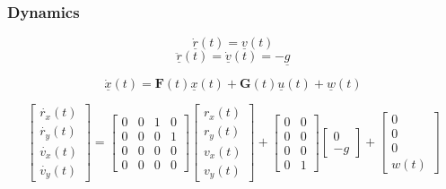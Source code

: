 \documentclass{article}
\begin{document}
\subsubsection{Dynamics}

\begin{equation}
    \underline{\dot{r}}(t) = \underline{v}(t)
\end{equation}
\begin{equation}
    \underline{\ddot{r}}(t) = \underline{\dot{v}}(t) = -\underline{g}
\end{equation}

\begin{equation}
    \underline{\dot{x}}(t) = \mathbf{F}(t)\underline{x}(t) + \mathbf{G}(t)\underline{u}(t) + \underline{w}(t)
\end{equation}

\begin{equation*}
    \begin{bmatrix} \dot{r_x}(t) \\ \dot{r_y}(t) \\ \dot{v_x}(t) \\ \dot{v_y}(t) \end{bmatrix} = 
    \begin{bmatrix} 0 & 0 & 1 & 0 \\ 0 & 0 & 0 & 1 \\ 0 & 0 & 0 & 0 \\ 0 & 0 & 0 & 0 \end{bmatrix}
    \begin{bmatrix} r_x(t)\\r_y(t)\\v_x(t)\\v_y(t) \end{bmatrix} +
    \begin{bmatrix} 0 & 0 \\ 0 & 0 \\ 0 & 0 \\ 0 & 1 \end{bmatrix}
    \begin{bmatrix} 0\\-g \end{bmatrix} +
    \begin{bmatrix}
        0 \\ 0 \\ 0 \\ w(t)
    \end{bmatrix}
\end{equation*}
\end{document}

